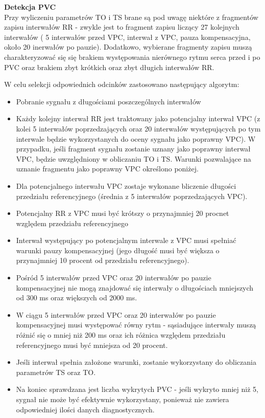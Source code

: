 \documentclass[a4paper, 11pt]{article}
\begin{document}
\textbf{Detekcja PVC}\\
Przy wyliczeniu parametrów TO i TS brane są pod uwagę niektóre z fragmentów zapisu interwałów RR - zwykle jest to fragment zapisu liczący 27 kolejnych 
interwałów ( 5 interwałów przed VPC, interwał z VPC, pauza kompensacyjna,
około 20 inerwałów po pauzie). Dodatkowo, wybierane fragmenty zapisu muszą  charakteryzować się się brakiem występowania nierównego rytmu serca przed i po PVC oraz brakiem zbyt krótkich oraz zbyt długich interwałów RR.
\par W celu selekcji odpowiednich odcinków zastosowano następujący algorytm:
\begin{itemize}
\item Pobranie sygnału z długościami poszczególnych interwałów
\item Każdy kolejny interwał RR jest traktowany jako
potencjalny interwał VPC (z kolei 5 interwałów poprzedzających oraz 20 interwałów występujących po tym interwale będzie wykorzystanych do oceny
sygnału jako poprawny VPC). 
W przypadku, jeśli fragment sygnału zostanie uznany jako poprawny
interwał VPC, będzie uwzględniony w obliczaniu TO i TS.
Warunki pozwalające na uznanie fragmentu jako poprawny VPC określono poniżej.
\item Dla potencjalnego interwału VPC zostaje wykonane bliczenie długości przedziału referencyjnego 
(średnia z  5 interwałów poprzedzających VPC).
\item Potencjalny RR z VPC musi być 
krótszy o przynajmniej 20 procnet względem przedziału referencyjnego
\item Interwał występujący po potencjalnym interwale z VPC musi spełniać 
warunki pauzy kompensacyjnej (jego długość musi być większa o przynajmniej 10 procent od przedziału referencyjnego).
\item Pośród 5 interwałów przed VPC
oraz 20 interwałów po pauzie kompensacyjnej nie mogą znajdować się
interwały o długościach
mniejszych od 300 ms oraz większych od 2000 ms.
\item W ciągu 5 interwałów przed VPC
oraz 20 interwałów po pauzie kompensacyjnej musi występować
równy rytm - sąsiadujące interwały muszą różnić się o mniej
niż 200 ms oraz ich różnica względem przedziału referencyjnego musi być mniejsza
od 20 procent.
\item Jeśli interwał spełnia założone warunki, zostanie 
wykorzystany do obliczania parametrów TS oraz TO.
\item Na koniec sprawdzana jest liczba wykrytych 
PVC - jeśli wykryto mniej niż 5, sygnał nie może być efektywnie 
wykorzystany, ponieważ nie zawiera odpowiedniej ilości
danych diagnostycznych. 
\end{itemize}
\end{document}
